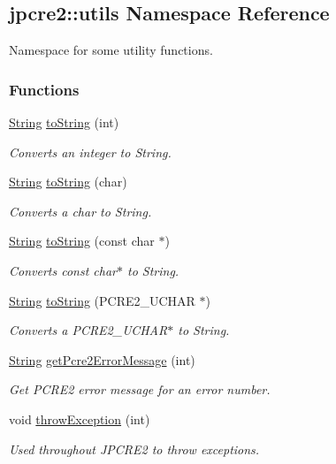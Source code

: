 \hypertarget{namespacejpcre2_1_1utils}{}\subsection{jpcre2\+:\+:utils Namespace Reference}
\label{namespacejpcre2_1_1utils}


Namespace for some utility functions.  


\subsubsection*{Functions}
\begin{DoxyCompactItemize}
\item 
\hyperlink{namespacejpcre2_a91f03070152fb228bc116c5a737f1d16}{String} \hyperlink{namespacejpcre2_1_1utils_a3603a3493202e7408e18fd0a912bf725}{to\+String} (int)
\begin{DoxyCompactList}\small\item\em Converts an integer to String. \end{DoxyCompactList}\item 
\hyperlink{namespacejpcre2_a91f03070152fb228bc116c5a737f1d16}{String} \hyperlink{namespacejpcre2_1_1utils_a917512161b56047d6ef240bdba2ac212}{to\+String} (char)
\begin{DoxyCompactList}\small\item\em Converts a char to String. \end{DoxyCompactList}\item 
\hyperlink{namespacejpcre2_a91f03070152fb228bc116c5a737f1d16}{String} \hyperlink{namespacejpcre2_1_1utils_a4065a2a40144999cd2a94e7a7e1d5eb6}{to\+String} (const char $\ast$)
\begin{DoxyCompactList}\small\item\em Converts const char$\ast$ to String. \end{DoxyCompactList}\item 
\hyperlink{namespacejpcre2_a91f03070152fb228bc116c5a737f1d16}{String} \hyperlink{namespacejpcre2_1_1utils_aea66a35f467adf41730c5a3bb21be6ed}{to\+String} (P\+C\+R\+E2\+\_\+\+U\+C\+H\+AR $\ast$)
\begin{DoxyCompactList}\small\item\em Converts a P\+C\+R\+E2\+\_\+\+U\+C\+H\+A\+R$\ast$ to String. \end{DoxyCompactList}\item 
\hyperlink{namespacejpcre2_a91f03070152fb228bc116c5a737f1d16}{String} \hyperlink{namespacejpcre2_1_1utils_a46868509af4188b7250b01384a16427e}{get\+Pcre2\+Error\+Message} (int)
\begin{DoxyCompactList}\small\item\em Get P\+C\+R\+E2 error message for an error number. \end{DoxyCompactList}\item 
void \hyperlink{namespacejpcre2_1_1utils_ae46ee8a2fbb7bc5b583aee0d1f047052}{throw\+Exception} (int)
\begin{DoxyCompactList}\small\item\em Used throughout J\+P\+C\+R\+E2 to throw exceptions. \end{DoxyCompactList}\end{DoxyCompactItemize}


